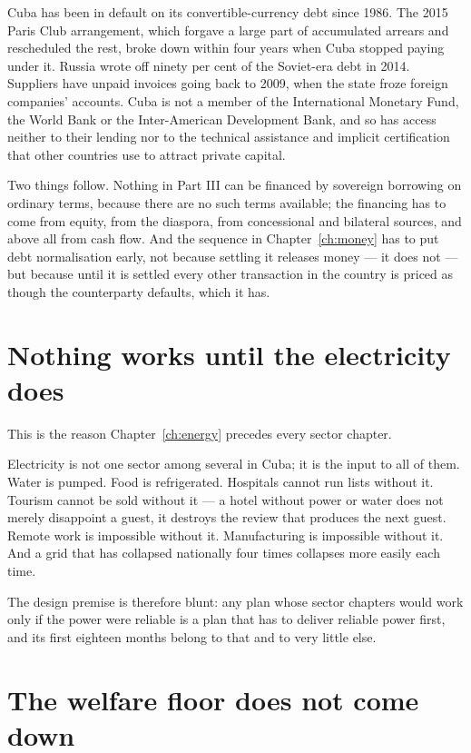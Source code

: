 Cuba has been in default on its convertible-currency debt since 1986. The 2015
Paris Club arrangement, which forgave a large part of accumulated arrears and
rescheduled the rest, broke down within four years when Cuba stopped paying
under it. Russia wrote off ninety per cent of the Soviet-era debt in 2014.
Suppliers have unpaid invoices going back to 2009, when the state froze foreign
companies' accounts. Cuba is not a member of the International Monetary Fund,
the World Bank or the Inter-American Development Bank, and so has access neither
to their lending nor to the technical assistance and implicit certification
that other countries use to attract private capital.

Two things follow. Nothing in Part III can be financed by sovereign borrowing on
ordinary terms, because there are no such terms available; the financing has to
come from equity, from the diaspora, from concessional and bilateral sources,
and above all from cash flow. And the sequence in Chapter~\ref{ch:money} has to
put debt normalisation early, not because settling it releases money --- it does
not --- but because until it is settled every other transaction in the country
is priced as though the counterparty defaults, which it has.

\section{Nothing works until the electricity does}

This is the reason Chapter~\ref{ch:energy} precedes every sector chapter.

Electricity is not one sector among several in Cuba; it is the input to all of
them. Water is pumped. Food is refrigerated. Hospitals cannot run lists without
it. Tourism cannot be sold without it --- a hotel without power or water does
not merely disappoint a guest, it destroys the review that produces the next
guest. Remote work is impossible without it. Manufacturing is impossible without
it. And a grid that has collapsed nationally four times collapses more easily
each time.

The design premise is therefore blunt: any plan whose sector chapters would work
only if the power were reliable is a plan that has to deliver reliable power
first, and its first eighteen months belong to that and to very little else.

\section{The welfare floor does not come down}

